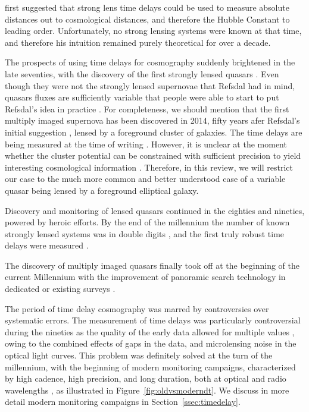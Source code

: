 \citet{Ref64} first suggested that strong lens time delays could be
used to measure absolute distances out to cosmological distances, and
therefore the Hubble Constant to leading order. Unfortunately, no
strong lensing systems were known at that time, and therefore his
intuition remained purely theoretical for over a decade.

The prospects of using time delays for cosmography suddenly brightened
in the late seventies, with the discovery of the first strongly lensed
quasars \citep{WCW79}. Even though they were not the strongly lensed
supernovae that Refsdal had in mind, quasars fluxes are sufficiently
variable \citep{Van82} that people were able to start to put Refsdal's
idea in practice \citep{Van89}. For completeness, we should mention
that the first multiply imaged supernova has been discovered in 2014,
fifty years afer Refsdal's initial suggestion \citep{Kel++15}, lensed
by a foreground cluster of galaxies. The time delays are being
measured at the time of writing
\citep{Rod++16,Kel++16}. However, it is unclear at the moment whether the
cluster potential can be constrained with sufficient precision to
yield interesting cosmological information \citep{Tre++16}. Therefore,
in this review, we will restrict our case to the much more common and
better understood case of a variable quasar being lensed by a
foreground elliptical galaxy.

Discovery and monitoring of lensed quasars continued in the eighties and
nineties, powered by heroic efforts. By the end of the millennium the
number of known strongly lensed systems was in double digits
\citep{CSS02}, and the first truly robust time delays were measured
\citep{Kun++97,Sch++97}.

The discovery of multiply imaged quasars finally took off at the
beginning of the current Millennium with the improvement of panoramic
search technology in dedicated or existing surveys
\citep{Bro++03,Oguri:2006p5865,Agn++15}.

The period of time delay cosmography was marred by controversies over
systematic errors.  The measurement of time delays was particularly
controversial during the nineties as the quality of the early data
allowed for multiple values \citep{PRH92}, owing to the combined
effects of gaps in the data, and microlensing noise in the optical
light curves. This problem was definitely solved at the turn of the
millennium, with the beginning of modern monitoring campaigns,
characterized by high cadence, high precision, and long duration, both
at optical and radio wavelengths
\citep{Fas++99,Fas++02,Bur++02,Eig++05}, as illustrated in Figure~\ref{fig:oldvsmoderndt}. We discuss in more detail
modern monitoring campaigns in Section~\ref{ssec:timedelay}.

